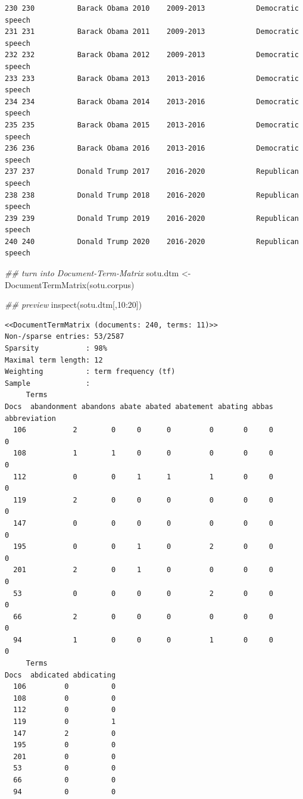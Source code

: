 \documentclass[
  letterpaper,
  DIV=11,
  numbers=noendperiod]{scrreprt}
\newenvironment{Shaded}{\begin{snugshade}}{\end{snugshade}}
\newcommand{\DecValTok}[1]{\textcolor[rgb]{0.68,0.00,0.00}{#1}}
\newcommand{\DocumentationTok}[1]{\textcolor[rgb]{0.37,0.37,0.37}{\textit{#1}}}
\newcommand{\FunctionTok}[1]{\textcolor[rgb]{0.28,0.35,0.67}{#1}}
\newcommand{\NormalTok}[1]{\textcolor[rgb]{0.00,0.23,0.31}{#1}}
\newcommand{\OtherTok}[1]{\textcolor[rgb]{0.00,0.23,0.31}{#1}}
\newcommand{\SpecialCharTok}[1]{\textcolor[rgb]{0.37,0.37,0.37}{#1}}
\begin{document}
\begin{verbatim}
230 230          Barack Obama 2010    2009-2013            Democratic    speech
231 231          Barack Obama 2011    2009-2013            Democratic    speech
232 232          Barack Obama 2012    2009-2013            Democratic    speech
233 233          Barack Obama 2013    2013-2016            Democratic    speech
234 234          Barack Obama 2014    2013-2016            Democratic    speech
235 235          Barack Obama 2015    2013-2016            Democratic    speech
236 236          Barack Obama 2016    2013-2016            Democratic    speech
237 237          Donald Trump 2017    2016-2020            Republican    speech
238 238          Donald Trump 2018    2016-2020            Republican    speech
239 239          Donald Trump 2019    2016-2020            Republican    speech
240 240          Donald Trump 2020    2016-2020            Republican    speech
\end{verbatim}

\begin{Shaded}
\begin{Highlighting}[]
\DocumentationTok{\#\# turn into Document{-}Term{-}Matrix}
\NormalTok{sotu.dtm }\OtherTok{\textless{}{-}} \FunctionTok{DocumentTermMatrix}\NormalTok{(sotu.corpus)}
\end{Highlighting}
\end{Shaded}

\begin{Shaded}
\begin{Highlighting}[]
\DocumentationTok{\#\# preview}
\FunctionTok{inspect}\NormalTok{(sotu.dtm[,}\DecValTok{10}\SpecialCharTok{:}\DecValTok{20}\NormalTok{])}
\end{Highlighting}
\end{Shaded}

\begin{verbatim}
<<DocumentTermMatrix (documents: 240, terms: 11)>>
Non-/sparse entries: 53/2587
Sparsity           : 98%
Maximal term length: 12
Weighting          : term frequency (tf)
Sample             :
     Terms
Docs  abandonment abandons abate abated abatement abating abbas abbreviation
  106           2        0     0      0         0       0     0            0
  108           1        1     0      0         0       0     0            0
  112           0        0     1      1         1       0     0            0
  119           2        0     0      0         0       0     0            0
  147           0        0     0      0         0       0     0            0
  195           0        0     1      0         2       0     0            0
  201           2        0     1      0         0       0     0            0
  53            0        0     0      0         2       0     0            0
  66            2        0     0      0         0       0     0            0
  94            1        0     0      0         1       0     0            0
     Terms
Docs  abdicated abdicating
  106         0          0
  108         0          0
  112         0          0
  119         0          1
  147         2          0
  195         0          0
  201         0          0
  53          0          0
  66          0          0
  94          0          0
\end{verbatim}
\end{document}
